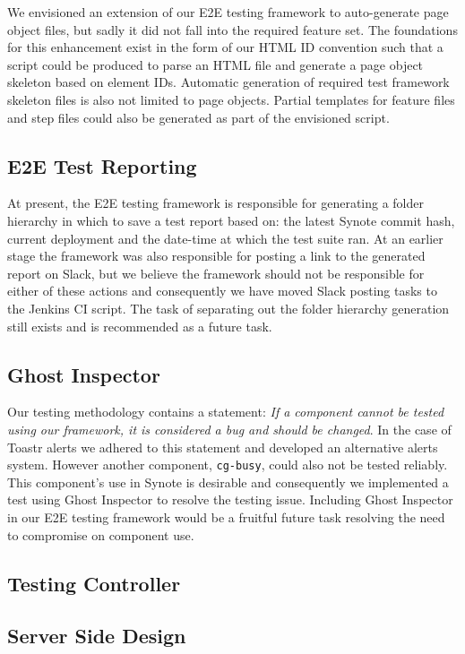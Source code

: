 We envisioned an extension of our E2E testing framework to auto-generate page object files, but sadly it did not fall into the required feature set. The foundations for this enhancement exist in the form of our HTML ID convention such that a script could be produced to parse an HTML file and generate a page object skeleton based on element IDs. Automatic generation of required test framework skeleton files is also not limited to page objects. Partial templates for feature files and step files could also be generated as part of the envisioned script.\\    

\subsection{E2E Test Reporting}
\label{subsec:e2e-test-reporting}

At present, the E2E testing framework is responsible for generating a folder hierarchy  in which to save a test report based on: the latest Synote commit hash, current deployment and the date-time at which the test suite ran. At an earlier stage the framework was also responsible for posting a link to the generated report on Slack, but we believe the framework should not be responsible for either of these actions and consequently we have moved Slack posting tasks to the Jenkins CI script. The task of separating out the folder hierarchy generation still exists and is recommended as a future task.\\

\subsection{Ghost Inspector}
\label{subsec:ghost-inspector}

Our testing methodology contains a statement: \textit{If a component cannot be tested using our framework, it is considered a bug and should be changed}. In the case of Toastr alerts we adhered to this statement and developed an alternative alerts system. However another component, \texttt{cg-busy}, could also not be tested reliably. This component's use in Synote is desirable and consequently we implemented a test using Ghost Inspector to resolve the testing issue. Including Ghost Inspector in our E2E testing framework would be a fruitful future task resolving the need to compromise on component use.\\ 

\subsection{Testing Controller}
\label{subsec:testing-controller}



\subsection{Server Side Design}
\label{subsec:server-side-design}